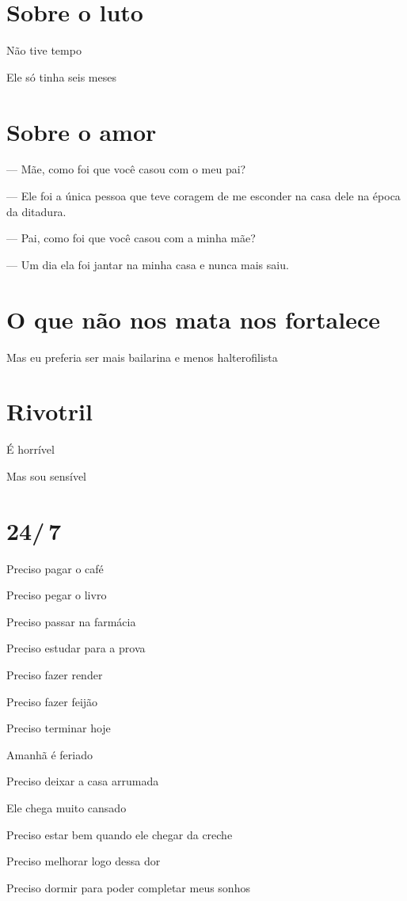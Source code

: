 \chapter{Sobre o luto}

{\parindent0pt\parskip1pt
Não tive tempo

Ele só tinha seis meses
}

\chapter{Sobre o amor}\label{sobre-o-amor}

{\parindent0pt\parskip1pt\raggedright
--- Mãe, como foi que você casou com o meu pai?

--- Ele foi a única pessoa que teve coragem de me esconder na casa dele
na época da ditadura.\medskip

--- Pai, como foi que você casou com a minha mãe?

--- Um dia ela foi jantar na minha casa e nunca mais saiu.}

\chapter{O que não nos mata nos fortalece}

Mas eu preferia ser mais bailarina e menos halterofilista


\chapter{Rivotril}

{\parindent0pt\parskip1pt\raggedright
É horrível

Mas sou sensível

\chapter{24/\,7}

Preciso pagar o café

Preciso pegar o livro

Preciso passar na farmácia

Preciso estudar para a prova

Preciso fazer render

Preciso fazer feijão

Preciso terminar hoje

Amanhã é feriado

Preciso deixar a casa arrumada

Ele chega muito cansado

Preciso estar bem quando ele chegar da creche

Preciso melhorar logo dessa dor

Preciso dormir para poder completar meus sonhos}

